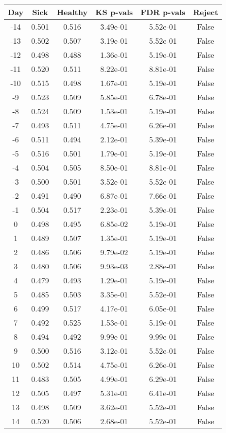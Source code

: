 \begin{tabular}{c|c|c|c|c|c}
Day &  Sick & Healthy &  KS p-vals & FDR p-vals & Reject\\
\hline
-14 & 0.501 &   0.516 &   3.49e-01 &   5.52e-01 &  False\\
-13 & 0.502 &   0.507 &   3.19e-01 &   5.52e-01 &  False\\
-12 & 0.498 &   0.488 &   1.36e-01 &   5.19e-01 &  False\\
-11 & 0.520 &   0.511 &   8.22e-01 &   8.81e-01 &  False\\
-10 & 0.515 &   0.498 &   1.67e-01 &   5.19e-01 &  False\\
 -9 & 0.523 &   0.509 &   5.85e-01 &   6.78e-01 &  False\\
 -8 & 0.524 &   0.509 &   1.53e-01 &   5.19e-01 &  False\\
 -7 & 0.493 &   0.511 &   4.75e-01 &   6.26e-01 &  False\\
 -6 & 0.511 &   0.494 &   2.12e-01 &   5.39e-01 &  False\\
 -5 & 0.516 &   0.501 &   1.79e-01 &   5.19e-01 &  False\\
 -4 & 0.504 &   0.505 &   8.50e-01 &   8.81e-01 &  False\\
 -3 & 0.500 &   0.501 &   3.52e-01 &   5.52e-01 &  False\\
 -2 & 0.491 &   0.490 &   6.87e-01 &   7.66e-01 &  False\\
 -1 & 0.504 &   0.517 &   2.23e-01 &   5.39e-01 &  False\\
  0 & 0.498 &   0.495 &   6.85e-02 &   5.19e-01 &  False\\
  1 & 0.489 &   0.507 &   1.35e-01 &   5.19e-01 &  False\\
  2 & 0.486 &   0.506 &   9.79e-02 &   5.19e-01 &  False\\
  3 & 0.480 &   0.506 &   9.93e-03 &   2.88e-01 &  False\\
  4 & 0.479 &   0.493 &   1.29e-01 &   5.19e-01 &  False\\
  5 & 0.485 &   0.503 &   3.35e-01 &   5.52e-01 &  False\\
  6 & 0.499 &   0.517 &   4.17e-01 &   6.05e-01 &  False\\
  7 & 0.492 &   0.525 &   1.53e-01 &   5.19e-01 &  False\\
  8 & 0.494 &   0.492 &   9.99e-01 &   9.99e-01 &  False\\
  9 & 0.500 &   0.516 &   3.12e-01 &   5.52e-01 &  False\\
 10 & 0.502 &   0.514 &   4.75e-01 &   6.26e-01 &  False\\
 11 & 0.483 &   0.505 &   4.99e-01 &   6.29e-01 &  False\\
 12 & 0.505 &   0.497 &   5.31e-01 &   6.41e-01 &  False\\
 13 & 0.498 &   0.509 &   3.62e-01 &   5.52e-01 &  False\\
 14 & 0.520 &   0.506 &   2.68e-01 &   5.52e-01 &  False\\
\end{tabular}
